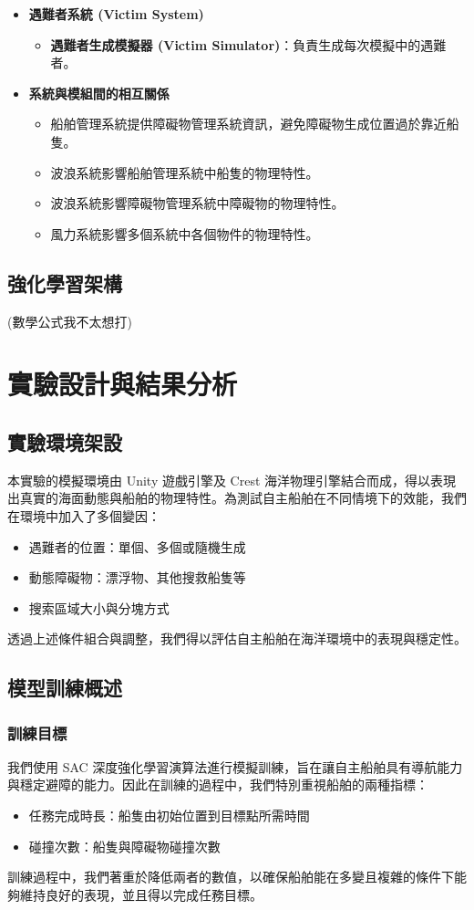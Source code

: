 \documentclass[12pt,a4paper]{ctexart}
\begin{document}
\begin{itemize}
	 \item \textbf{遇難者系統 (Victim System)}
	\begin{itemize}
	    \item \textbf{遇難者生成模擬器 (Victim Simulator)}：負責生成每次模擬中的遇難者。
	\end{itemize}
	
	 \item \textbf{系統與模組間的相互關係}
	\begin{itemize}
	    \item 船舶管理系統提供障礙物管理系統資訊，避免障礙物生成位置過於靠近船隻。
	    \item 波浪系統影響船舶管理系統中船隻的物理特性。
	    \item 波浪系統影響障礙物管理系統中障礙物的物理特性。
	    \item 風力系統影響多個系統中各個物件的物理特性。
	\end{itemize}

\end{itemize}

\subsection{強化學習架構}
(數學公式我不太想打)

\section{實驗設計與結果分析}

\subsection{實驗環境架設}
本實驗的模擬環境由 Unity 遊戲引擎及 Crest 海洋物理引擎結合而成，得以表現出真實的海面動態與船舶的物理特性。為測試自主船舶在不同情境下的效能，我們在環境中加入了多個變因：
\begin{itemize}
    \item 遇難者的位置：單個、多個或隨機生成
    \item 動態障礙物：漂浮物、其他搜救船隻等
    \item 搜索區域大小與分塊方式
\end{itemize}
透過上述條件組合與調整，我們得以評估自主船舶在海洋環境中的表現與穩定性。

\subsection{模型訓練概述}
\subsubsection{訓練目標}
我們使用 SAC 深度強化學習演算法進行模擬訓練，旨在讓自主船舶具有導航能力與穩定避障的能力。因此在訓練的過程中，我們特別重視船舶的兩種指標：
\begin{itemize}
    \item 任務完成時長：船隻由初始位置到目標點所需時間
    \item 碰撞次數：船隻與障礙物碰撞次數
\end{itemize}
訓練過程中，我們著重於降低兩者的數值，以確保船舶能在多變且複雜的條件下能夠維持良好的表現，並且得以完成任務目標。
\end{document}
